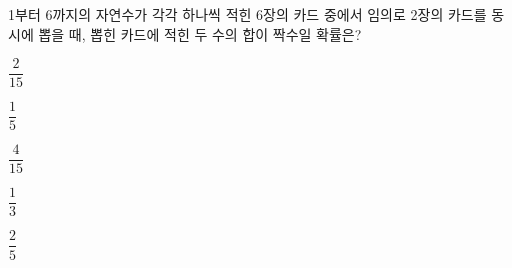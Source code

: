 1부터 6까지의 자연수가 각각 하나씩 적힌 6장의 카드 중에서 임의로 2장의 카드를 동시에 뽑을 때, 뽑힌 카드에 적힌 두 수의 합이 짝수일 확률은?
\begin{choicesii}{\rule[-3ex]{0pt}{8ex}$\dfrac{2}{15}$}{\rule[-3ex]{0pt}{8ex}$\dfrac{1}{5}$}{\rule[-3ex]{0pt}{8ex}$\dfrac{4}{15}$}{\rule[-3ex]{0pt}{8ex}$\dfrac{1}{3}$}{\rule[-3ex]{0pt}{8ex}$\dfrac{2}{5}$}\end{choicesii}
